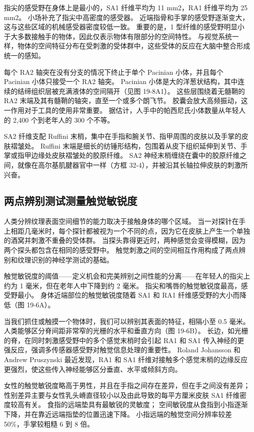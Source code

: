 指尖的感受野在身体上是最小的，SA1 纤维平均为 11 mm2，RA1 纤维平均为 25 mm2。 
小场补充了指尖中高密度的感受器。 
近端指骨和手掌的感受野逐渐变大，这与这些区域的机械感受器密度较低一致。 
重要的是，1 型纤维的感受野明显小于大多数接触手的物体，因此仅表示物体有限部分的空间特性。 
与视觉系统一样，物体的空间特征分布在受刺激的受体群中，这些受体的反应在大脑中整合形成统一的感知。


每个 RA2 轴突在没有分支的情况下终止于单个 Pacinian 小体，并且每个 Pacinian 小体只接受一个 RA2 轴突。 
Pacinian 小体是大的洋葱状结构，其中连续的结缔组织层被充满液体的空间隔开（见图 19-8A1）。 
这些层围绕着无髓鞘的 RA2 末端及其有髓鞘的轴突，直至一个或多个朗飞节。 胶囊会放大高频振动，这一作用对于工具的使用非常重要。 据估计，人手中的帕西尼氏小体数量从年轻人的 2,400 个到老年人的 300 个不等。



SA2 纤维支配 Ruffini 末梢，集中在手指和腕关节、指甲周围的皮肤以及手掌的皮肤褶皱处。 Ruffini 末端是细长的纺锤形结构，包围着从皮下组织延伸到关节、手掌或指甲边缘处皮肤褶皱处的胶原纤维。 SA2 神经末梢缠绕在囊中的胶原纤维之间，就像在高尔基肌腱器官中一样（方框 32-4），并被沿其长轴拉伸皮肤的刺激所兴奋。


\subsection{两点辨别测试测量触觉敏锐度}
人类分辨纹理表面空间细节的能力取决于接触身体的哪个区域。 当一对探针在手上相距几毫米时，每个探针都被视为一个不同的点，因为它在皮肤上产生一个单独的酒窝并刺激不重叠的受体群。 当探头靠得更近时，两种感觉会变得模糊，因为两个探头都包含在相同的感受野中。 触觉刺激之间的空间相互作用构成了两点辨别和纹理识别的神经学测试的基础。

触觉敏锐度的阈值——定义机会和完美辨别之间性能的分离——在年轻人的指尖上约为 1 毫米，但在老年人中下降到约 2 毫米。 指尖和嘴唇的触觉敏锐度最高，感受野最小。 身体近端部位的触觉敏锐度随着 SA1 和 RA1 纤维感受野的大小而降低（图 19-6A）。

当我们抓住或触摸一个物体时，我们可以辨别其表面的特征，相隔小至 0.5 毫米。 人类能够区分脊间距非常窄的光栅的水平和垂直方向（图 19-6B）。 长边，如光栅的脊，在同时刺激感受野中的多个感觉末梢时会引起 RA1 和 SA1 传入神经的更强反应，强调多传感器感受野对触觉信息处理的重要性。 Roland Johansson 和 Andrew Pruszynski 最近发现，RA1 和 SA1 纤维对接触多个感觉末梢的边缘反应更强烈，使这些传入神经能够区分垂直、水平或倾斜方向。

女性的触觉敏锐度略高于男性，并且在手指之间存在差异，但在手之间没有差异； 性别差异主要与女性乳头嵴直径较小以及由此导致的每平方厘米皮肤 SA1 纤维密度较高有关。 食指的远端垫具有最敏锐的灵敏度； 空间敏锐度从食指到小指逐渐下降，并在靠近远端指垫的位置迅速下降。 小指远端的触觉空间分辨率较差 50\%，手掌较粗糙 6 到 8 倍。

